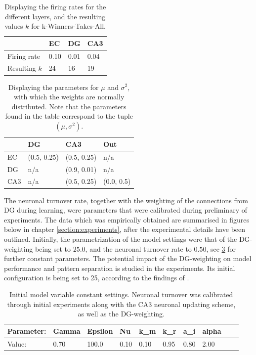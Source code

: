 \begin{table}
\centering
\caption{Displaying the firing rates for the different layers, and the resulting values $k$ for k-Winners-Takes-All.}
\label{table:firing_rates}
\begin{tabular}{l|l|l|l|}
\cline{2-4}
                                  & EC   & DG   & CA3  \\ \hline
\multicolumn{1}{|l|}{Firing rate} & 0.10 & 0.01 & 0.04 \\ \hline
\multicolumn{1}{|l|}{Resulting $k$} & 24 & 16 & 19 \\ \hline
\end{tabular}
\end{table}

\begin{table}[]
\centering
\caption{Displaying the parameters for $\mu$ and $\sigma^2$, with which the weights are normally distributed. Note that the parameters found in the table correspond to the tuple $(\mu, \sigma^2)$.}
\label{table:initial_weight_distributions}
\begin{tabular}{l|l|l|l|}
\cline{2-4}
                          & DG        & CA3       & Out      \\ \hline
\multicolumn{1}{|l|}{EC}  & (0.5, 0.25) & (0.5, 0.25) & n/a      \\ \hline
\multicolumn{1}{|l|}{DG}  & n/a       & (0.9, 0.01) & n/a      \\ \hline
\multicolumn{1}{|l|}{CA3} & n/a       & (0.5, 0.25) & (0.0, 0.5) \\ \hline
\end{tabular}
\end{table}

The neuronal turnover rate, together with the weighting of the connections from DG during learning, were parameters that were calibrated during preliminary of experiments. The data which was empirically obtained are summarised in figures below in chapter \ref{section:experiments}, after the experimental details have been outlined. Initially, the parametrization of the model settings were that of the DG-weighting being set to $25.0$, and the neuronal turnover rate to $0.50$, see \ref{table:initial_settings} for further constant parameters. The potential impact of the DG-weighting on model performance and pattern separation is studied in the experiments. Its initial configuration is being set to 25, according to the findings of \citep{Wakagi2008}.

\begin{table}
\centering
\caption{Initial model variable constant settings. Neuronal turnover was calibrated through initial experiments along with the CA3 neuronal updating scheme, as well as the DG-weighting.}
\label{table:initial_settings}
\begin{tabular}{|l|l|l|l|l|l|l|l|l|l|}
\cline{1-8}
Parameter: & Gamma & Epsilon & Nu   & k\_m & k\_r & a\_i & alpha \\ \hline
Value:     & 0.70  & 100.0   & 0.10 & 0.10 & 0.95 & 0.80 & 2.00 \\ \hline
\end{tabular}
\end{table}


